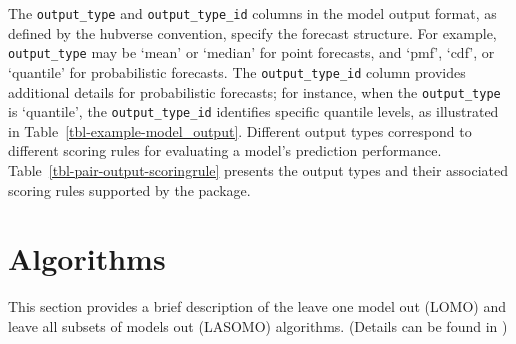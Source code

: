 \documentclass[
  article,
  shortnames,
  notitle]{jss}
\begin{document}
The \texttt{output\_type} and \texttt{output\_type\_id} columns in the
model output format, as defined by the hubverse convention, specify the
forecast structure. For example, \texttt{output\_type} may be `mean' or
`median' for point forecasts, and `pmf', `cdf', or `quantile' for
probabilistic forecasts. The \texttt{output\_type\_id} column provides
additional details for probabilistic forecasts; for instance, when the
\texttt{output\_type} is `quantile', the \texttt{output\_type\_id}
identifies specific quantile levels, as illustrated in
Table~\ref{tbl-example-model_output}. Different output types correspond
to different scoring rules for evaluating a model's prediction
performance. Table~\ref{tbl-pair-output-scoringrule} presents the output
types and their associated scoring rules supported by the
 package.

\begin{table}


\caption{\label{tbl-pair-output-scoringrule}Pairs of output types and
their associated scoring rules for evaluating prediction performance.}

\end{table}%

\section{Algorithms}\label{sec:algorithms}

This section provides a brief description of the leave one model out
(LOMO) and leave all subsets of models out (LASOMO) algorithms. (Details
can be found in \citet{kim2024})
\end{document}
